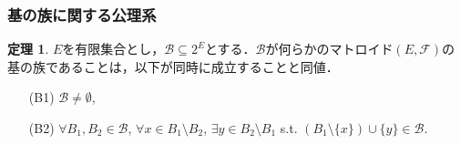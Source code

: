 \documentclass[xelatex,ja=standard,a4paper,14pt,everyparhook=compat]{bxjsarticle}
\theoremstyle{definition}
\newtheorem{theorem}{定理}[subsection]
\begin{document}
\newpage

\subsubsection*{基の族に関する公理系}

\setcounter{theorem}{8}
\begin{theorem}
    $E$を有限集合とし，$\mathcal{B} \subseteq 2^E$とする．$\mathcal{B}$が何らかのマトロイド$(E, \mathcal{F})$の基の族であることは，以下が同時に成立することと同値． \begin{enumerate}
        \item[(B1)] $\mathcal{B} \neq \emptyset$,
        \item[(B2)] $\forall B_1, B_2 \in \mathcal{B}$, $\forall x \in B_1 \setminus B_2$, $\exists y \in B_2 \setminus B_1$ s.t. $(B_1 \setminus \{x\}) \cup \{y\} \in \mathcal{B}$.
    \end{enumerate}
\end{theorem}
\end{document}
